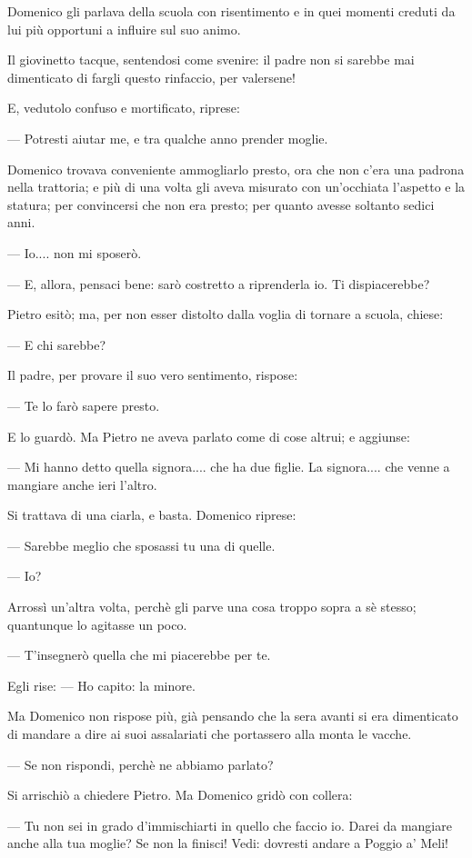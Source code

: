 Domenico gli parlava della scuola con risentimento e in quei momenti creduti da lui più opportuni a influire sul suo animo.

Il giovinetto tacque, sentendosi come svenire: il padre non si sarebbe mai dimenticato di fargli questo rinfaccio, per valersene!

E, vedutolo confuso e mortificato, riprese:

— Potresti aiutar me, e tra qualche anno prender moglie.

Domenico trovava conveniente ammogliarlo presto, ora che non c’era una padrona nella trattoria; e più di una volta gli aveva misurato con un’occhiata l’aspetto e la statura; per convincersi che non era presto; per quanto avesse soltanto sedici anni.

— Io.... non mi sposerò.

— E, allora, pensaci bene: sarò costretto a riprenderla io. Ti dispiacerebbe?

Pietro esitò; ma, per non esser distolto dalla voglia di tornare a scuola, chiese:

— E chi sarebbe?

Il padre, per provare il suo vero sentimento, rispose:

— Te lo farò sapere presto.

E lo guardò. Ma Pietro ne aveva parlato come di cose altrui; e aggiunse:

— Mi hanno detto quella signora.... che ha due figlie. La signora.... che venne a mangiare anche ieri l'altro.

Si trattava di una ciarla, e basta. Domenico riprese:

— Sarebbe meglio che sposassi tu una di quelle.

— Io?

Arrossì un'altra volta, perchè gli parve una cosa troppo sopra a sè stesso; quantunque lo agitasse un poco.

— T'insegnerò quella che mi piacerebbe per te.

Egli rise: — Ho capito: la minore.

Ma Domenico non rispose più, già pensando che la sera avanti si era dimenticato di mandare a dire ai suoi assalariati che portassero alla monta le vacche.

— Se non rispondi, perchè ne abbiamo parlato?

Si arrischiò a chiedere Pietro. Ma Domenico gridò con collera:

— Tu non sei in grado d'immischiarti in quello che faccio io. Darei da mangiare anche alla tua moglie? Se non la finisci! Vedi: dovresti andare a Poggio a' Meli!

